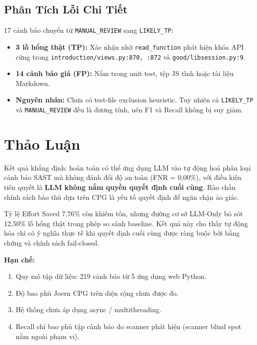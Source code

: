 \documentclass[12pt, a4paper]{article}
\begin{document}
\subsection{Phân Tích Lỗi Chi Tiết}

17 cảnh báo chuyển từ \texttt{MANUAL\_REVIEW} sang \texttt{LIKELY\_TP}:

\begin{itemize}
  \item \textbf{3 lỗ hổng thật (TP):} Xác nhận nhờ \texttt{read\_function}
        phát hiện khóa API cứng trong
        \texttt{introduction/views.py:870, :872} và
        \texttt{good/libsession.py:9}.
  \item \textbf{14 cảnh báo giả (FP):} Nằm trong unit test, tệp JS tĩnh
        hoặc tài liệu Markdown.
  \item \textbf{Nguyên nhân:} Chưa có test-file exclusion heuristic. Tuy
        nhiên cả \texttt{LIKELY\_TP} và \texttt{MANUAL\_REVIEW} đều là
        dương tính, nên F1 và Recall không bị suy giảm.
\end{itemize}

\section{Thảo Luận}

Kết quả khẳng định: hoàn toàn có thể ứng dụng LLM vào tự động hoá phân
loại cảnh báo SAST mà không đánh đổi độ an toàn (FNR = 0,00\%), với
điều kiện tiên quyết là \textbf{LLM không nắm quyền quyết định cuối
cùng}. Rào chắn chính sách bảo thủ dựa trên CPG là yếu tố quyết định
để ngăn chặn ảo giác.

Tỷ lệ Effort Saved 7,76\% còn khiêm tốn, nhưng đường cơ sở LLM-Only
bỏ sót 12,50\% lỗ hổng thật trong phép so sánh baseline. Kết quả này
cho thấy tự động hóa chỉ có ý nghĩa thực tế khi quyết định cuối cùng
được ràng buộc bởi bằng chứng và chính sách fail-closed.

\noindent\textbf{Hạn chế:}
\begin{enumerate}
  \item Quy mô tập dữ liệu: 219 cảnh báo từ 5 ứng dụng web Python.
  \item Độ bao phủ Joern CPG trên diện rộng chưa được đo.
  \item Hệ thống chưa áp dụng async / multithreading.
  \item Recall chỉ bao phủ tập cảnh báo do scanner phát hiện (scanner
        blind spot nằm ngoài phạm vi).
\end{enumerate}
\end{document}
